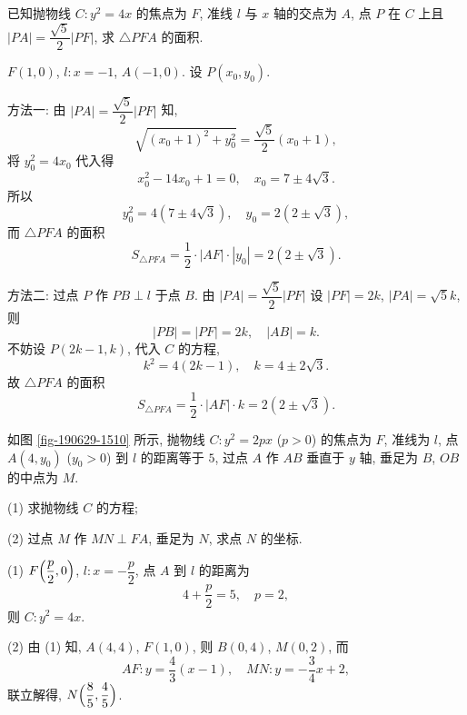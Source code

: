 \begin{exercise}
    已知抛物线 $C\colon y^2= 4x$ 的焦点为 $F$, 准线 $l$ 与 $x$ 轴的交点为 $A$, 点 $P$ 在 $C$ 上且 $|PA|= \dfrac{\sqrt5}2 |PF|$, 求 $\triangle PFA$ 的面积. 
\end{exercise}
\beginsolution
    $F(1,0)$, $l\colon x=-1$, $A(-1,0)$. 设 $P(x_0,y_0)$.

    方法一: 由 $|PA|= \dfrac{\sqrt5}2 |PF|$ 知,
    \[\sqrt{(x_0+1)^2+ y_0^2}= \frac{\sqrt5}{2}(x_0+1),\]
    将 $y_0^2= 4x_0$ 代入得
    \[x_0^2- 14x_0+ 1= 0,\quad x_0= 7\pm 4\sqrt3.\]
    所以
    \[y_0^2= 4(7\pm 4\sqrt3),\quad y_0= 2(2\pm\sqrt3),\]
    而 $\triangle PFA$ 的面积
    \[S_{\triangle PFA}= \frac12\cdot |AF|\cdot |y_0|
    = 2(2\pm\sqrt3).\]

    方法二: 过点 $P$ 作 $PB\perp l$ 于点 $B$. 由 $|PA|= \dfrac{\sqrt5}2 |PF|$ 设 $|PF|= 2k$, $|PA|= \sqrt5k$, 则
    \[|PB|= |PF|= 2k,\quad |AB|= k.\]
    不妨设 $P(2k-1,k)$, 代入 $C$ 的方程,
    \[k^2= 4(2k-1),\quad k=4\pm 2\sqrt3.\]
    故 $\triangle PFA$ 的面积
    \[S_{\triangle PFA}= \frac12\cdot |AF|\cdot k
    = 2(2\pm\sqrt3).\]
\endsolution

\begin{exercise}
    如图 \ref{fig-190629-1510} 所示, 抛物线 $C\colon y^2 =2px$ ($p>0$) 的焦点为 $F$, 准线为 $l$, 点 $A(4,y_0)$ ($y_0>0$) 到 $l$ 的距离等于 $5$, 过点 $A$ 作 $AB$ 垂直于 $y$ 轴, 垂足为 $B$, $OB$ 的中点为 $M$.
    
    (1) 求抛物线 $C$ 的方程;
    
    (2) 过点 $M$ 作 $MN\perp FA$, 垂足为 $N$, 求点 $N$ 的坐标.
\end{exercise}
\beginsolution
    (1) $F\Bigl(\dfrac{p}2,0\Bigr)$, $l\colon x=-\dfrac{p}2$, 点 $A$ 到 $l$ 的距离为
    \[4+\frac{p}2= 5,\quad p=2,\]
    则 $C\colon y^2= 4x$.

    (2) 由 (1) 知, $A(4,4)$, $F(1,0)$, 则 $B(0,4)$, $M(0,2)$, 而
    \[AF\colon y= \frac43(x-1),\quad
    MN\colon y= -\frac34 x+2,\]
    联立解得, $N\Bigl(\dfrac85,\dfrac45\Bigr)$.
\endsolution

